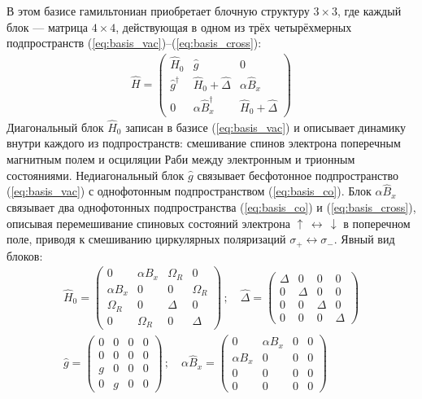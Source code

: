 \documentclass[11pt]{article}    %
\numberwithin{equation}{section}
\begin{document}
В этом базисе гамильтониан приобретает блочную структуру $3\times 3$,
где каждый блок --- матрица $4\times 4$, действующая в одном из трёх
четырёхмерных подпространств (\ref{eq:basis_vac})--(\ref{eq:basis_cross}):
\begin{gather}
    \hat{H} =
\begin{pmatrix}
    \hat{H}_0 & \hat{g} & 0  \\
    \hat{g}^{\dag} & \hat{H}_0 + \hat{\Delta} & \alpha\hat{B}_x \\
    0 & \alpha \hat{B}_x^{\dag} & \hat{H}_0 + \hat{\Delta}
\end{pmatrix}
\end{gather}
Диагональный блок $\hat{H}_0$ записан в базисе (\ref{eq:basis_vac}) и
описывает динамику внутри каждого из подпространств: смешивание спинов
электрона поперечным магнитным полем и осциляции Раби между
электронным и трионным состояниями. Недиагональный блок $\hat{g}$
связывает бесфотонное подпространство (\ref{eq:basis_vac}) с однофотонным
подпространством (\ref{eq:basis_co}). Блок $\alpha\hat{B}_x$ связывает два однофотонных
подпространства (\ref{eq:basis_co}) и (\ref{eq:basis_cross}), описывая
перемешивание спиновых состояний электрона
$\uparrow \, \leftrightarrow \, \downarrow$ в поперечном поле, приводя к смешиванию
циркулярных поляризаций $\sigma_+ \leftrightarrow \sigma_-$. Явный вид блоков:
\begin{gather}
    \hat{H}_{0} =
\begin{pmatrix}
    0 & \alpha B_x & \Omega_R & 0 \\
    \alpha B_x & 0 & 0 & \Omega_R \\
    \Omega_R & 0 & \Delta & 0 \\
    0 & \Omega_R & 0 & \Delta
\end{pmatrix} \, ; \quad
    \hat{\Delta} =
\begin{pmatrix}
    \Delta & 0 & 0 & 0 \\
    0 & \Delta & 0 & 0 \\
    0 & 0 & \Delta & 0 \\
    0 & 0 & 0 & \Delta
\end{pmatrix} \\ \nonumber
    \hat{g} =
\begin{pmatrix}
    0 & 0 & 0 & 0 \\
    0 & 0 & 0 & 0 \\
    g & 0 & 0 & 0 \\
    0 & g & 0 & 0
\end{pmatrix} \, ; \quad
    \alpha \hat{B}_x =
\begin{pmatrix}
    0 & \alpha B_x & 0 & 0 \\
    \alpha B_x & 0 & 0 & 0 \\
    0 & 0 & 0 & 0 \\
    0 & 0 & 0 & 0
\end{pmatrix}
\end{gather}
\end{document}
